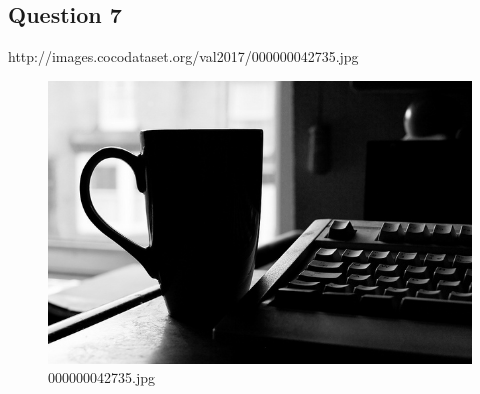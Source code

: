 \subsection*{Question 7}
http://images.cocodataset.org/val2017/000000042735.jpg
    \begin{figure}[h]
        \centering
        \includegraphics[width=0.8\linewidth]{../image set/easy/000000042735.jpg}
        \caption{000000042735.jpg}
    \end{figure}
